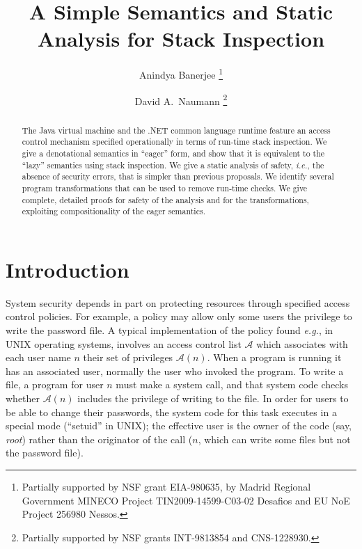 \documentclass[submission,copyright,creativecommons]{eptcs}
\title{A Simple Semantics and Static Analysis for Stack Inspection}
\author{Anindya Banerjee 
\institute{IMDEA Software Institute\\ Madrid, Spain}\thanks{Partially 
supported by NSF grant EIA-980635, by Madrid Regional Government MINECO Project TIN2009-14599-C03-02 Desafios and EU NoE Project 256980 Nessos.
}
\email{anindya.banerjee@imdea.org}
\and
David A.~Naumann
\institute{Stevens Institute of Technology\\ Hoboken, NJ 07030, USA}\thanks{Partially supported by NSF grants INT-9813854 and CNS-1228930.}
\email{naumann@cs.stevens.edu}
}
\newcommand{\ie}{{\em i.e.}}
\newcommand{\eg}{{\em e.g.}}
\newcommand{\A}{\mathcal{A}}
\newcommand{\n}{n} \newcommand{\p}{p} \newcommand{\Ps}{\Pi} \newcommand{\h}{h}
\begin{document}
\maketitle

\begin{abstract}
The Java virtual machine and the .NET common language runtime feature an access control mechanism specified operationally in
terms of run-time stack inspection.
We give a denotational semantics in ``eager'' form, and show that it is equivalent to
the ``lazy'' semantics using stack inspection.  
We give a static analysis of safety, \ie, the absence of security errors,
that is simpler than previous proposals.   
We identify several program transformations that can be used to remove run-time
checks.  We give complete, detailed proofs for safety of the analysis and for the
transformations, exploiting compositionality of the eager semantics.
\end{abstract}



\section{Introduction}
\label{sec:intro}

System security depends in part on protecting resources through
specified access control policies. For example, a policy may allow
only some users the privilege to write the password file.  A typical
implementation of the policy found \eg, in UNIX operating systems,
involves an access control list $\A$ which associates with each user
name $\n$ their set of privileges $\A(\n)$.  When a program is running
it has an associated user, normally the user who invoked the program.
To write a file, a program for user $\n$ must make a system call, and
that system code checks whether $\A(\n)$ includes the privilege of
writing to the file. In order for users to be able to change their
passwords, the system code for this task executes in a special mode
(``setuid'' in UNIX); the effective user is the owner of the code
(say, \textit{root}) rather than the originator of the call ($\n$,
which can write some files but not the password file).
\end{document}
